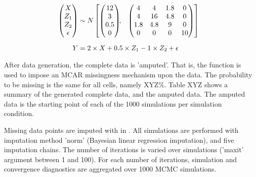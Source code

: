 \documentclass[article]{jss}
\newcommand{\fct}[1]{\code{#1()}}
\begin{document}
\begin{align*}
\begin{pmatrix}X\\
Z_{1}\\
Z_{2}\\
\epsilon
\end{pmatrix} &\sim  N
\begin{bmatrix}
\begin{pmatrix}
12\\
3\\
0.5\\
0
\end{pmatrix}\!\!,&
\begin{pmatrix}
4 & 4 & 1.8 & 0\\
4 & 16 & 4.8 & 0\\
1.8 & 4.8 & 9 & 0\\
0 & 0 & 0 & 10
\end{pmatrix}
\end{bmatrix}\\[2\jot]
Y &=  2 \times X + 0.5 \times Z_1 - 1 \times Z_2 + \epsilon
\end{align*}

After data generation, the complete data is 'amputed'. That is, the  function \fct{ampute} is used to impose an MCAR missingness mechanism upon the data. The probability to be missing is the same for all cells, namely XYZ\%. Table XYZ shows a summary of the generated complete data, and the amputed data. The amputed data is the starting point of each of the 1000 simulations per simulation condition.

Missing data points are imputed with  in . All simulations are performed with imputation method 'norm' (Bayesian linear regression imputation), and five imputation chains. The number of iterations is varied over simulations ('maxit' argument between 1 and 100). For each number of iterations, simulation and convergence diagnostics are aggregated over 1000 MCMC simulations. 




\end{document}
